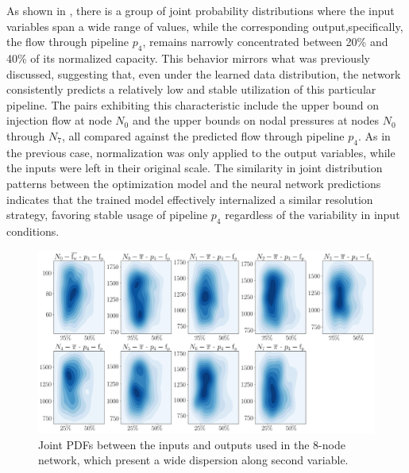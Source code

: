 As shown in , there is a group of joint probability distributions where the input variables span a wide range of values, while the corresponding output,specifically, the flow through pipeline $p_4$, remains narrowly concentrated between 20\% and 40\% of its normalized capacity. This behavior mirrors what was previously discussed, suggesting that, even under the learned data distribution, the network consistently predicts a relatively low and stable utilization of this particular pipeline. The pairs exhibiting this characteristic include the upper bound on injection flow at node $N_0$ and the upper bounds on nodal pressures at nodes $N_0$ through $N_7$, all compared against the predicted flow through pipeline $p_4$. As in the previous case, normalization was only applied to the output variables, while the inputs were left in their original scale. The similarity in joint distribution patterns between the optimization model and the neural network predictions indicates that the trained model effectively internalized a similar resolution strategy, favoring stable usage of pipeline $p_4$ regardless of the variability in input conditions.


\begin{figure}[H]
    \begin{center}
        \includegraphics[width=.9\textwidth]{figures/Chapter_NonLinealCensnet/inputs_outputs_1 KDE.png}
    \end{center}
    \caption{Joint PDFs between the inputs and outputs used in the 8-node network, which present a wide dispersion along second variable. }
    \label{fig:joint_distributions_inputs_outputs_1_KDE}
\end{figure}


